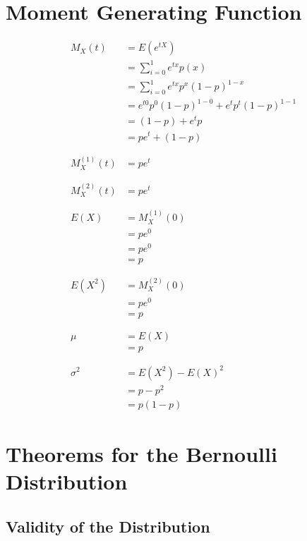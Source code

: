 \documentclass[]{book}
\begin{document}
\section{Moment Generating Function}\label{moment-generating-function}

\[\begin{align*}
M_{X}(t)
    &= E(e^{tX}) \\
    &= \sum\limits_{i=0}^{1} e^{tx} p(x) \\
    &= \sum\limits_{i=0}^{1} e^{tx} p^{x} (1-p)^{1-x}\\
    &= e^{t0} p^0 (1-p)^{1-0} + e^t p^t (1-p)^{1-1}\\
    &= (1-p) + e^t p\\
    &=pe^t + (1-p) \\
    \\
    \\
M^{(1)}_X(t) &= pe^t\\
  \\
  \\
M^{(2)}_X(t) &= pe^t\\
  \\
  \\
E(X)
    &=M^{(1)}_X(0)\\
    &= pe^0\\
    &= pe^0\\
    &= p\\
    \\
    \\
E(X^2)
    &= M^{(2)}_X(0)\\
    &= pe^0\\
    &= p\\
    \\
    \\
\mu
  &= E(X)\\
    &= p\\
  \\
  \\
\sigma^2
    &= E(X^2) - E(X)^2 \\
    &= p - p^2 \\
    &= p (1-p)
\end{align*}
\]

\section{Theorems for the Bernoulli
Distribution}\label{theorems-for-the-bernoulli-distribution}

\subsection{Validity of the
Distribution}\label{validity-of-the-distribution}
\end{document}

